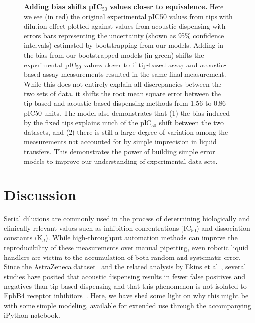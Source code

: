 \documentclass[aps,pre,twocolumn,nofootinbib,superscriptaddress,linenumbers]{revtex4-1}
\begin{document}
\begin{figure}[tb]
  \caption{{\bf Adding bias shifts pIC$_{50}$ values closer to equivalence.}
  Here we see (in red) the original experimental pIC50 values from tips with dilution effect plotted against values from acoustic dispensing with errors bars representing the uncertainty (shown as 95\% confidence intervals) estimated by bootstrapping from our models. 
  Adding in the bias from our bootstrapped models (in green) shifts the experimental pIC$_{50}$ values closer to if tip-based assay and acoustic-based assay measurements resulted in the same final measurement. 
  While this does not entirely explain all discrepancies between the two sets of data, it shifts the root mean square error between the tip-based and acoustic-based dispensing methods from 1.56 to 0.86 pIC50 units.
  The model also demonstrates that (1) the bias induced by the fixed tips explains much of the pIC$_{50}$ shift between the two datasets, and (2) there is still a large degree of variation among the measurements not accounted for by simple imprecision in liquid transfers.
  This demonstrates the power of building simple error models to improve our understanding of experimental data sets.
  }
  \label{fig:IC50_bias}
\end{figure}

\section{Discussion}

Serial dilutions are commonly used in the process of determining biologically and clinically relevant values such as inhibition concentrations (IC$_{ 50}$)  and dissociation constants (K$_{d}$). 
While high-throughput automation methods can improve the reproducibility of these measurements over manual pipetting, even robotic liquid handlers are victim to the accumulation of both random and systematic error.
Since the AstraZeneca dataset~\cite{barlaam_novel_2009,barlaam_pyrimidine_2010} and the related analysis by Ekins et al~\cite{ekins_dispensing_2013}, several studies have posited that acoustic dispensing results in fewer false positives and negatives than tip-based dispensing and that this phenomenon is not isolated to EphB4 receptor inhibitors~\cite{wingfield_impact_2012,olechno_direct_2013,olechno_sound_2013,olechno_improving_2006}. 
Here, we have shed some light on why this might be with some simple modeling, available for extended use through the accompanying iPython notebook.
\end{document}
